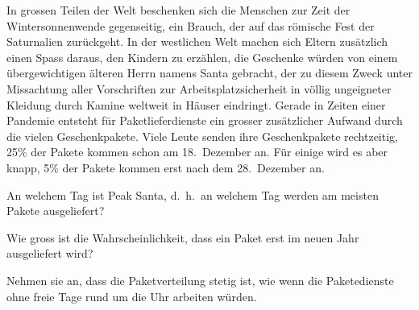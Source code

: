 In grossen Teilen der Welt beschenken sich die Menschen zur Zeit
der Wintersonnenwende gegenseitig, ein Brauch, der auf das römische
Fest der Saturnalien zurückgeht.
In der westlichen Welt machen sich Eltern zusätzlich einen Spass 
daraus, den Kindern zu erzählen, die Geschenke würden von einem
übergewichtigen älteren Herrn namens Santa gebracht, der zu diesem Zweck
unter Missachtung aller Vorschriften zur Arbeitsplatzsicherheit
in völlig ungeigneter Kleidung durch Kamine weltweit in Häuser eindringt.
Gerade in Zeiten einer Pandemie entsteht für Paketlieferdienste
ein grosser zusätzlicher Aufwand durch die vielen Geschenkpakete.
Viele Leute senden ihre Geschenkpakete rechtzeitig, 25\% der Pakete
kommen schon am 18.~Dezember an.
Für einige wird es aber knapp, 5\% der Pakete kommen erst nach dem
28.~Dezember an.
\begin{teilaufgaben}
\item
An welchem Tag ist Peak Santa, d.~h.~an welchem Tag werden
am meisten Pakete ausgeliefert?
\item
Wie gross ist die Wahrscheinlichkeit, dass ein Paket erst im neuen
Jahr ausgeliefert wird?
\end{teilaufgaben}

\begin{hinweis}
Nehmen sie an, dass die Paketverteilung stetig ist, wie wenn die
Paketedienste ohne freie Tage rund um die Uhr arbeiten würden.
\end{hinweis}


